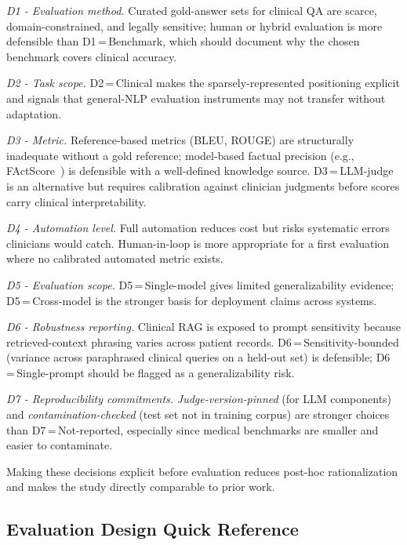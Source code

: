 \documentclass[acmsmall, nonacm, screen]{acmart}
\begin{document}
\textit{D1 - Evaluation method.} Curated gold-answer sets for clinical
QA are scarce, domain-constrained, and legally sensitive; human or
hybrid evaluation is more defensible than D1\,=\,Benchmark, which
should document why the chosen benchmark covers clinical accuracy.

\textit{D2 - Task scope.} D2\,=\,Clinical makes the
sparsely-represented positioning explicit and signals that general-NLP
evaluation instruments may not transfer without adaptation.

\textit{D3 - Metric.} Reference-based metrics (BLEU, ROUGE) are
structurally inadequate without a gold reference; model-based factual
precision (e.g., FActScore~\cite{factscore2023}) is defensible with a
well-defined knowledge source. D3\,=\,LLM-judge is an alternative but
requires calibration against clinician judgments before scores carry
clinical interpretability.

\textit{D4 - Automation level.} Full automation reduces cost but
risks systematic errors clinicians would catch. Human-in-loop is more
appropriate for a first evaluation where no calibrated automated
metric exists.

\textit{D5 - Evaluation scope.} D5\,=\,Single-model gives limited
generalizability evidence; D5\,=\,Cross-model is the stronger basis
for deployment claims across systems.

\textit{D6 - Robustness reporting.} Clinical RAG is exposed to prompt
sensitivity because retrieved-context phrasing varies across patient
records. D6\,=\,Sensitivity-bounded (variance across paraphrased
clinical queries on a held-out set) is defensible;
D6\,=\,Single-prompt should be flagged as a generalizability risk.

\textit{D7 - Reproducibility commitments.}
\textit{Judge-version-pinned} (for LLM components) and
\textit{contamination-checked} (test set not in training corpus)
are stronger choices than D7\,=\,Not-reported, especially since
medical benchmarks are smaller and easier to contaminate.

Making these decisions explicit before evaluation reduces post-hoc
rationalization and makes the study directly comparable to prior
work.

\subsection{Evaluation Design Quick Reference}
\label{subsec:quickref}
\end{document}
